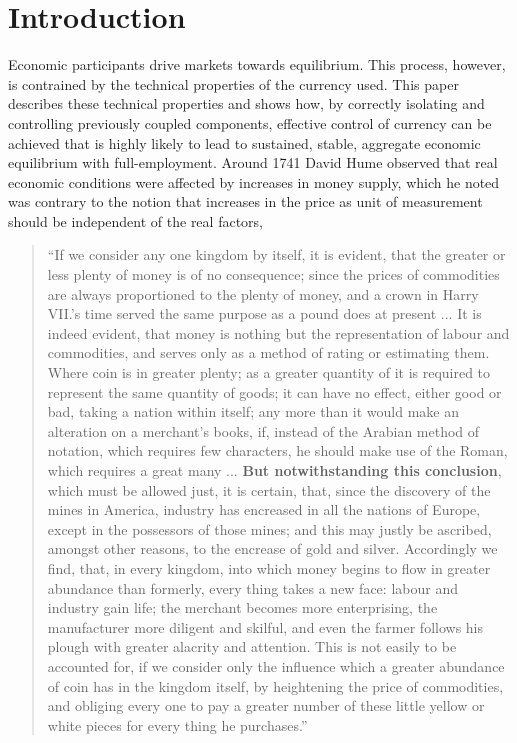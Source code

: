 \section{Introduction}

Economic participants drive markets towards equilibrium. This process, however, is contrained by the
technical properties of the currency used. This paper describes these technical properties and shows
how, by correctly isolating and controlling previously coupled components, effective control of
currency can be achieved that is highly likely to lead to sustained, stable, aggregate economic
equilibrium with full-employment. Around 1741 David Hume \cite{hume1741} observed that real economic
conditions were affected by increases in money supply, which he noted was contrary to the notion
that increases in the price as unit of measurement should be independent of the real factors,

\begin{quotation}
\fontsize{8pt}{8pt}

``If we consider any one kingdom by itself, it is evident, that the greater or less plenty of money is
    of no consequence; since the prices of commodities are always proportioned to the plenty of
    money, and a crown in Harry VII.’s time served the same purpose as a pound does at present ...
    It is indeed evident, that money is nothing but the representation of labour and commodities,
    and serves only as a method of rating or estimating them. Where coin is in greater plenty; as a
    greater quantity of it is required to represent the same quantity of goods; it can have no
    effect, either good or bad, taking a nation within itself; any more than it would make an
    alteration on a merchant’s books, if, instead of the Arabian method of notation, which requires
    few characters, he should make use of the Roman, which requires a great many ... \textbf{But
    notwithstanding this conclusion}, which must be allowed just, it is certain, that, since the
    discovery of the mines in America, industry has encreased in all the nations of Europe, except
    in the possessors of those mines; and this may justly be ascribed, amongst other reasons, to the
    encrease of gold and silver.  Accordingly we find, that, in every kingdom, into which money
    begins to flow in greater abundance than formerly, every thing takes a new face: labour and
    industry gain life; the merchant becomes more enterprising, the manufacturer more diligent and
    skilful, and even the farmer follows his plough with greater alacrity and attention. This is not
    easily to be accounted for, if we consider only the influence which a greater abundance of coin
    has in the kingdom itself, by heightening the price of commodities, and obliging every one to
    pay a greater number of these little yellow or white pieces for every thing he purchases.''

\end{quotation}

